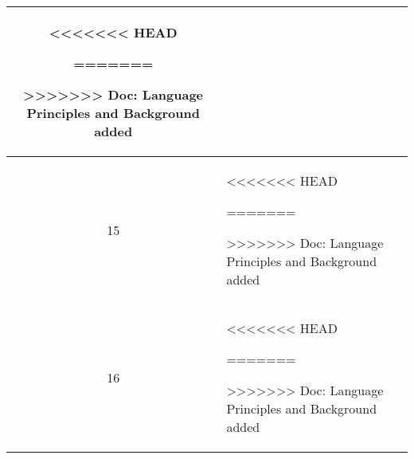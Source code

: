 \begin{center}
\begin{longtable}{|c|p{12cm}|}
\begin{journal}
<<<<<<< HEAD
	\item 
=======
  \item 
>>>>>>> Doc: Language Principles and Background added
\end{journal}
\\ \hline
15 & 
\begin{journal}
<<<<<<< HEAD
	\item 
=======
  \item 
>>>>>>> Doc: Language Principles and Background added
\end{journal}
\\ \hline
16 & 
\begin{journal}
<<<<<<< HEAD
	\item 
=======
  \item 
>>>>>>> Doc: Language Principles and Background added
\end{journal}
\\ \hline
\end{longtable}
\end{center}
